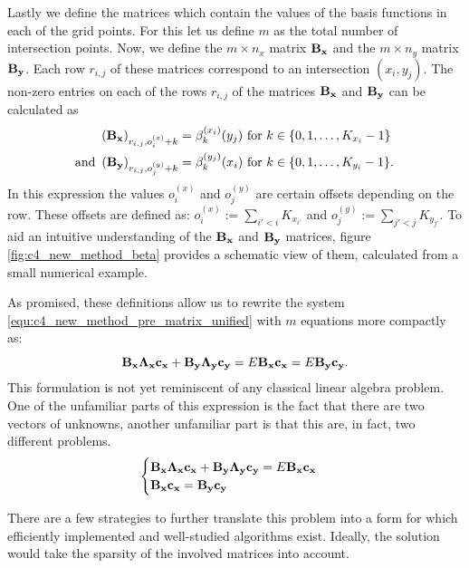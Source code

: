 Lastly we define the matrices which contain the values of the basis functions in each of the grid points. For this let us define $m$ as the total number of intersection points. Now, we define the $m \times n_x$ matrix $\vb{B_x}$ and the $m \times n_y$ matrix $\vb{B_y}$. Each row $r_{i,j}$ of these matrices correspond to an intersection $(x_i, y_j)$. The non-zero entries on each of the rows $r_{i,j}$ of the matrices $\vb{B_x}$ and $\vb{B_y}$ can be calculated as
\begin{align}
    \left(\vb{B_x}\right)_{r_{i,j}, o^{(x)}_{i} + k} & =  \beta_{k}^{(x_i)}(y_j) \text{ for $k \in \{0, 1, \dots, K_{x_i} - 1\}$ }   \nonumber                               \\
    \text{and }
    \left(\vb{B_y}\right)_{r_{i,j}, o^{(y)}_{j} + k} & =  \beta_{k}^{(y_j)}(x_i) \text{ for $k \in \{0, 1, \dots, K_{y_i} - 1\}$.} \label{equ:c4_new_method_beta_definition}
\end{align}
In this expression the values $o^{(x)}_{i}$ and $o^{(y)}_{j}$ are certain offsets depending on the row. These offsets are defined as: $o^{(x)}_{i} := \sum_{i' < i} K_{x_{i'}}$ and $o^{(y)}_{j} := \sum_{j' < j} K_{y_{j'}}$. To aid an intuitive understanding of the $\vb{B_x}$ and $\vb{B_y}$ matrices, figure \ref{fig:c4_new_method_beta} provides a schematic view of them, calculated from a small numerical example.

As promised, these definitions allow us to rewrite the system \eqref{equ:c4_new_method_pre_matrix_unified} with $m$ equations more compactly as:
$$
    \vb{B_x} \vb{\Lambda_x}\vb{c_x} + \vb{B_y} \vb{\Lambda_y}\vb{c_y} = E \vb{B_x} \vb{c_x} = E \vb{B_y} \vb{c_y}\text{.}
$$
This formulation is not yet reminiscent of any classical linear algebra problem. One of the unfamiliar parts of this expression is the fact that there are two vectors of unknowns, another unfamiliar part is that this are, in fact, two different problems.
\begin{equation}
    \begin{cases}
        \vb{B_x} \vb{\Lambda_x}\vb{c_x} + \vb{B_y} \vb{\Lambda_y}\vb{c_y} = E \vb{B_x} \vb{c_x} \\
        \vb{B_x} \vb{c_x} = \vb{B_y} \vb{c_y}
    \end{cases} \label{equ:c4_new_method_first_matrix_problem}
\end{equation}

There are a few strategies to further translate this problem into a form for which efficiently implemented and well-studied algorithms exist. Ideally, the solution would take the sparsity of the involved matrices into account.

